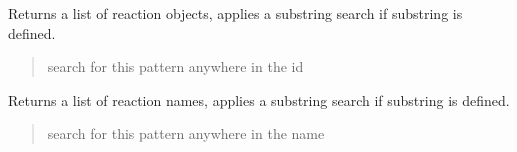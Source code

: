 \documentclass[letterpaper,12pt,english]{sphinxmanual}
\begin{document}
\begin{fulllineitems}
\begin{fulllineitems}
\begin{quote}
\begin{description}
\end{description}\end{quote}

\end{fulllineitems}


\begin{fulllineitems}
\label{\detokenize{api/core:cbmpy.CBModel.Model.getReactionObjects}}
\pysigstartsignatures
\pysiglinewithargsret
{}
{}
{}
\pysigstopsignatures
\sphinxAtStartPar
Returns a list of reaction objects, applies a substring search if substring is defined.
\begin{quote}\begin{description}
\sphinxAtStartPar
{} \textendash{} search for this pattern anywhere in the id

\end{description}\end{quote}

\end{fulllineitems}


\begin{fulllineitems}
\label{\detokenize{api/core:cbmpy.CBModel.Model.getReactionNames}}
\pysigstartsignatures
\pysiglinewithargsret
{}
{}
{}
\pysigstopsignatures
\sphinxAtStartPar
Returns a list of reaction names, applies a substring search if substring is defined.
\begin{quote}\begin{description}
\sphinxAtStartPar
{} \textendash{} search for this pattern anywhere in the name

\end{description}\end{quote}

\end{fulllineitems}


\end{fulllineitems}
\end{document}
